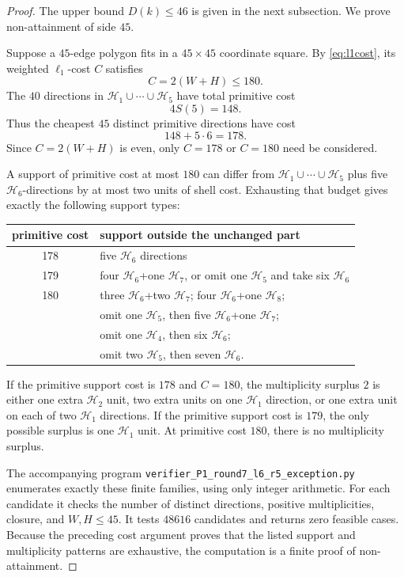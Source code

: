 \documentclass[11pt]{article}
\theoremstyle{definition}
\newcommand{\HH}{\mathcal H}
\begin{document}
\begin{proof}
The upper bound \(D(k)\le46\) is given in the next subsection.  We prove non-attainment of side \(45\).

Suppose a \(45\)-edge polygon fits in a \(45\times45\) coordinate square.  By
\eqref{eq:l1cost}, its weighted \(\ell_1\)-cost \(C\) satisfies
\[
C=2(W+H)\le180.
\]
The \(40\) directions in \(\HH_1\cup\cdots\cup\HH_5\) have total primitive cost
\[
4S(5)=148.
\]
Thus the cheapest \(45\) distinct primitive directions have cost
\[
148+5\cdot6=178.
\]
Since \(C=2(W+H)\) is even, only \(C=178\) or \(C=180\) need be considered.

A support of primitive cost at most \(180\) can differ from
\(\HH_1\cup\cdots\cup\HH_5\) plus five \(\HH_6\)-directions by at most two units of shell cost.  Exhausting that budget gives exactly the following support types:
\begin{center}
\begin{tabular}{c|l}
primitive cost & support outside the unchanged part\\
\hline
178 & five \(\HH_6\) directions\\
179 & four \(\HH_6\)+one \(\HH_7\), or omit one \(\HH_5\) and take six \(\HH_6\)\\
180 & three \(\HH_6\)+two \(\HH_7\); four \(\HH_6\)+one \(\HH_8\);\\
& omit one \(\HH_5\), then five \(\HH_6\)+one \(\HH_7\);\\
& omit one \(\HH_4\), then six \(\HH_6\);\\
& omit two \(\HH_5\), then seven \(\HH_6\).
\end{tabular}
\end{center}
If the primitive support cost is \(178\) and \(C=180\), the multiplicity surplus \(2\) is either one extra \(\HH_2\) unit, two extra units on one \(\HH_1\) direction, or one extra unit on each of two \(\HH_1\) directions.  If the primitive support cost is \(179\), the only possible surplus is one \(\HH_1\) unit.  At primitive cost \(180\), there is no multiplicity surplus.

The accompanying program
\texttt{verifier\_P1\_round7\_l6\_r5\_exception.py}
enumerates exactly these finite families, using only integer arithmetic.  For each candidate it checks the number of distinct directions, positive multiplicities, closure, and
\(W,H\le45\).  It tests \(48616\) candidates and returns zero feasible cases.  Because the preceding cost argument proves that the listed support and multiplicity patterns are exhaustive, the computation is a finite proof of non-attainment.
\end{proof}
\end{document}
